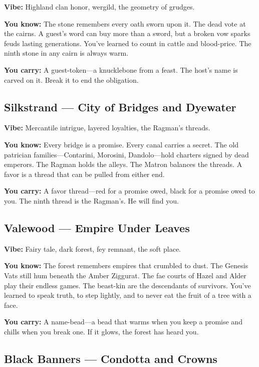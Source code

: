 \documentclass[10pt]{article}
\begin{document}
\textbf{Vibe:} Highland clan honor, wergild, the geometry of grudges.

\textbf{You know:} The stone remembers every oath sworn upon it. The dead vote 
at the cairns. A guest's word can buy more than a sword, but a broken vow sparks 
feuds lasting generations. You've learned to count in cattle and blood-price. 
The ninth stone in any cairn is always warm.

\textbf{You carry:} A guest-token—a knucklebone from a feast. The host's name 
is carved on it. Break it to end the obligation.

\subsection*{Silkstrand --- City of Bridges and Dyewater}

\textbf{Vibe:} Mercantile intrigue, layered loyalties, the Ragman's threads.

\textbf{You know:} Every bridge is a promise. Every canal carries a secret. The 
old patrician families—Contarini, Morosini, Dandolo—hold charters signed by dead 
emperors. The Ragman holds the alleys. The Matron balances the threads. A favor 
is a thread that can be pulled from either end.

\textbf{You carry:} A favor thread—red for a promise owed, black for a promise 
owed to you. The ninth thread is the Ragman's. He will find you.

\subsection*{Valewood --- Empire Under Leaves}

\textbf{Vibe:} Fairy tale, dark forest, fey remnant, the soft place.

\textbf{You know:} The forest remembers empires that crumbled to dust. The 
Genesis Vats still hum beneath the Amber Ziggurat. The fae courts of Hazel 
and Alder play their endless games. The beast-kin are the descendants of 
survivors. You've learned to speak truth, to step lightly, and to never eat 
the fruit of a tree with a face.

\textbf{You carry:} A name-bead—a bead that warms when you keep a promise 
and chills when you break one. If it glows, the forest has heard you.

\subsection*{Black Banners --- Condotta and Crowns}
\end{document}
